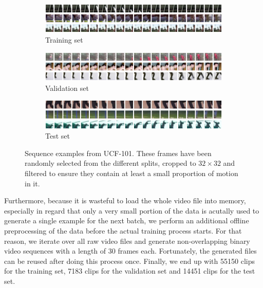 \begin{figure}[htb]
\centering
\begin{subfigure}{1.0\textwidth}
  \centering
  \includegraphics[width=1.0\linewidth]{figures/ds/ucf_train.png}
  \caption{Training set}
  \label{fig:ucf_train}
  \vspace{.1cm}
\end{subfigure}
\begin{subfigure}{1.0\textwidth}
  \centering
  \includegraphics[width=1.0\linewidth]{figures/ds/ucf_valid.png}
  \caption{Validation set}
  \label{fig:ucf_valid}
  \vspace{.1cm}
\end{subfigure}
\begin{subfigure}{1.0\textwidth}
  \centering
  \includegraphics[width=1.0\linewidth]{figures/ds/ucf_test.png}
  \caption{Test set}
  \label{fig:ucf_test}
\end{subfigure}
\caption[UCF-101 Crop Image Samples]{Sequence examples from UCF-101. These frames have been randomly selected from the different splits, cropped to $32 \times 32 $ and filtered to ensure they contain at least a small proportion of motion in it.}
\label{fig:ucf}
\end{figure}

Furthermore, because it is wasteful to load the whole video file into memory, especially in regard that only a very small portion of the data is acutally used to generate a single example for the next batch, we perform an additional offline preprocessing of the data before the actual training process starts. For that reason, we iterate over all raw video files and generate non-overlapping binary video sequences with a length of \num{30} frames each. Fortunately, the generated files can be reused after doing this process once. Finally, we end up with \num{55150} clips for the training set, \num{7183} clips for the validation set and \num{14451} clips for the test set.


